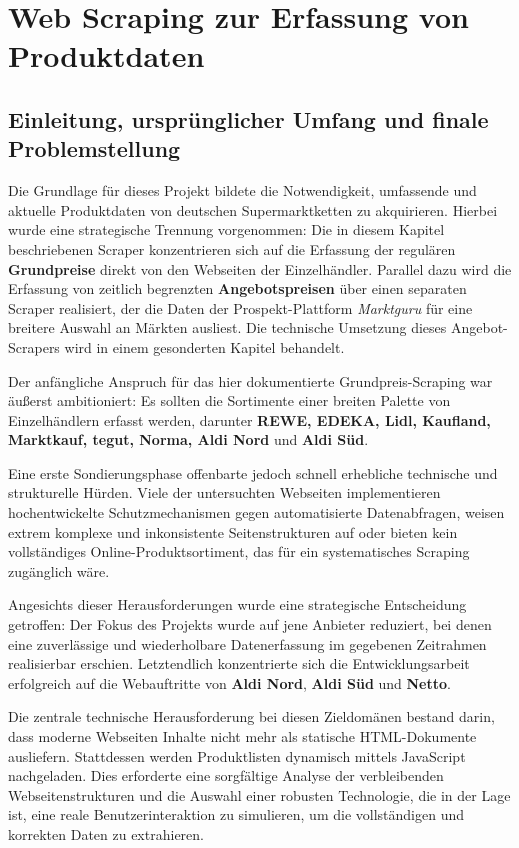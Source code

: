 \chapter{Web Scraping zur Erfassung von Produktdaten}
\renewcommand{\authorinitials}{MK}
\label{chap:web_scraping}

\section{Einleitung, ursprünglicher Umfang und finale Problemstellung}
Die Grundlage für dieses Projekt bildete die Notwendigkeit, umfassende und aktuelle Produktdaten von deutschen Supermarktketten zu akquirieren. Hierbei wurde eine strategische Trennung vorgenommen: Die in diesem Kapitel beschriebenen Scraper konzentrieren sich auf die Erfassung der regulären \textbf{Grundpreise} direkt von den Webseiten der Einzelhändler. Parallel dazu wird die Erfassung von zeitlich begrenzten \textbf{Angebotspreisen} über einen separaten Scraper realisiert, der die Daten der Prospekt-Plattform \textit{Marktguru} für eine breitere Auswahl an Märkten ausliest. Die technische Umsetzung dieses Angebot-Scrapers wird in einem gesonderten Kapitel behandelt.

Der anfängliche Anspruch für das hier dokumentierte Grundpreis-Scraping war äußerst ambitioniert: Es sollten die Sortimente einer breiten Palette von Einzelhändlern erfasst werden, darunter \textbf{REWE, EDEKA, Lidl, Kaufland, Marktkauf, tegut, Norma, Aldi Nord} und \textbf{Aldi Süd}.

Eine erste Sondierungsphase offenbarte jedoch schnell erhebliche technische und strukturelle Hürden. Viele der untersuchten Webseiten implementieren hochentwickelte Schutzmechanismen gegen automatisierte Datenabfragen, weisen extrem komplexe und inkonsistente Seitenstrukturen auf oder bieten kein vollständiges Online-Produktsortiment, das für ein systematisches Scraping zugänglich wäre.

Angesichts dieser Herausforderungen wurde eine strategische Entscheidung getroffen: Der Fokus des Projekts wurde auf jene Anbieter reduziert, bei denen eine zuverlässige und wiederholbare Datenerfassung im gegebenen Zeitrahmen realisierbar erschien. Letztendlich konzentrierte sich die Entwicklungsarbeit erfolgreich auf die Webauftritte von \textbf{Aldi Nord}, \textbf{Aldi Süd} und \textbf{Netto}.

Die zentrale technische Herausforderung bei diesen Zieldomänen bestand darin, dass moderne Webseiten Inhalte nicht mehr als statische HTML-Dokumente ausliefern. Stattdessen werden Produktlisten dynamisch mittels JavaScript nachgeladen. Dies erforderte eine sorgfältige Analyse der verbleibenden Webseitenstrukturen und die Auswahl einer robusten Technologie, die in der Lage ist, eine reale Benutzerinteraktion zu simulieren, um die vollständigen und korrekten Daten zu extrahieren.

